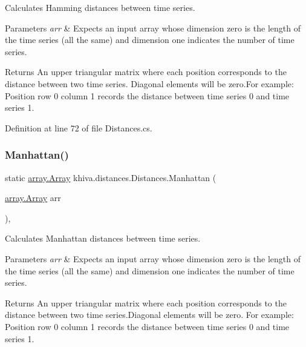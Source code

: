 Calculates Hamming distances between time series. 


\begin{DoxyParams}{Parameters}
{\em arr} & Expects an input array whose dimension zero is the length of the time series (all the same) and dimension one indicates the number of time series.\\
\hline
\end{DoxyParams}
\begin{DoxyReturn}{Returns}
An upper triangular matrix where each position corresponds to the distance between two time series. Diagonal elements will be zero.\+For example\+: Position row 0 column 1 records the distance between time series 0 and time series 1.
\end{DoxyReturn}


Definition at line 72 of file Distances.\+cs.

\mbox{\label{classkhiva_1_1distances_1_1_distances_a5b30df6dcb8bb413a81040757f453107}} 
\subsubsection{\texorpdfstring{Manhattan()}{Manhattan()}}
{\footnotesize\ttfamily static \mbox{\hyperlink{classkhiva_1_1array_1_1_array}{array.\+Array}} khiva.\+distances.\+Distances.\+Manhattan (\begin{DoxyParamCaption}\item[{\mbox{\hyperlink{classkhiva_1_1array_1_1_array}{array.\+Array}}}]{arr }\end{DoxyParamCaption})\hspace{0.3cm}{\ttfamily [inline]}, {\ttfamily [static]}}



Calculates Manhattan distances between time series. 


\begin{DoxyParams}{Parameters}
{\em arr} & Expects an input array whose dimension zero is the length of the time series (all the same) and dimension one indicates the number of time series.\\
\hline
\end{DoxyParams}
\begin{DoxyReturn}{Returns}
An upper triangular matrix where each position corresponds to the distance between two time series.\+Diagonal elements will be zero. For example\+: Position row 0 column 1 records the distance between time series 0 and time series 1.
\end{DoxyReturn}


